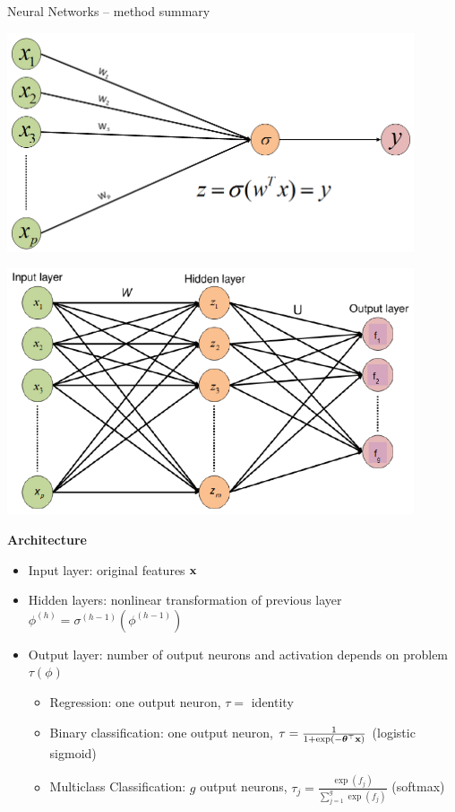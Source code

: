 \documentclass[11pt,compress,t,notes=noshow, xcolor=table]{beamer}
\newcommand{\highlight}[1]{\textcolor{hlcol}{\textbf{#1}}}
\begin{document}
\begin{frame2}{Neural Networks -- method summary}
  \smallskip
  \begin{center}
  \begin{minipage}[b]{0.24\textwidth}
    \includegraphics[width=0.9\textwidth]{figure/nn-single-neuron} \\
  \end{minipage}%
  \begin{minipage}[b]{0.24\textwidth}
    \includegraphics[width=0.9\textwidth]{figure/nn-feedforward} \\
  \end{minipage}%
  \end{center}

  \framebreak

  \footnotesize

  \highlight{Architecture}
  
  \begin{itemize}
      \item Input layer: original features $\mathbf{x}$
      \item Hidden layers: nonlinear transformation of previous layer $\phi^{(h)} = \sigma^{(h - 1)}(\phi^{(h-1)})$
      \item Output layer: number of output neurons and activation depends on problem $\tau(\phi)$
      \begin{itemize}
      \item Regression: one output neuron, $\tau = $ identity
      \item Binary classification: one output neuron, $\tau = \frac{1}{1 + \exp(- \bm{\theta}^\top \mathbf{x})}$ (logistic sigmoid)
      \item Multiclass Classification: $g$ output neurons, $\tau_j = \frac{\exp(f_j)}{\sum_{j=1}^g \exp(f_j)}$ (softmax)
  \end{itemize}
  \end{itemize}
  

\end{frame2}
\end{document}
